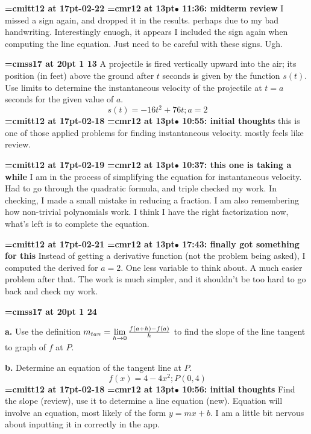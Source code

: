 {\medskip\noindent\bf\font\titlefont=cmitt12 at 17pt-02-22}\medskip
{\smallskip\noindent\bf\font\titlefont=cmr12 at 13pt\titlefont $\bullet$ 11:36: midterm review}\smallskip
I missed a sign again, and dropped it in the results. perhaps due to my bad handwriting. Interestingly enuogh, it appears I included the sign again when computing the line equation. Just need to be careful with these signs. Ugh.
\par

{\medskip\noindent\bf\font\titlefont=cmss17 at 20pt 1 13}\medskip
A projectile is fired vertically upward into the air; its
position (in feet) above the ground after $t$ seconds is
given by the function $s(t)$. Use limits to determine the
instantaneous velocity of the projectile at $t = a$ seconds
for the given value of $a$.
$$\
s(t) = -16t^2 + 76t; a = 2
$$
{\medskip\noindent\bf\font\titlefont=cmitt12 at 17pt-02-18}\medskip
{\smallskip\noindent\bf\font\titlefont=cmr12 at 13pt\titlefont $\bullet$ 10:55: initial thoughts}\smallskip
this is one of those applied problems for finding instantaneous velocity. mostly feels like review.
\par

{\medskip\noindent\bf\font\titlefont=cmitt12 at 17pt-02-19}\medskip
{\smallskip\noindent\bf\font\titlefont=cmr12 at 13pt\titlefont $\bullet$ 10:37: this one is taking a while}\smallskip
I am in the process of simplifying the equation for instantaneous velocity. Had to go through the quadratic formula, and triple checked my work. In checking, I made a small mistake in reducing a fraction. I am also remembering how non-trivial polynomials work. I think I have the right factorization now, what's left is to complete the equation.
\par

{\medskip\noindent\bf\font\titlefont=cmitt12 at 17pt-02-21}\medskip
{\smallskip\noindent\bf\font\titlefont=cmr12 at 13pt\titlefont $\bullet$ 17:43: finally got something for this}\smallskip
Instead of getting a derivative function (not the problem being asked), I computed the derived for $a = 2$. One less variable to think about. A much easier problem after that. The work is much simpler, and it shouldn't be too hard to go back and check my work.
\par

{\medskip\noindent\bf\font\titlefont=cmss17 at 20pt 1 24}\medskip
\par {\bf a.} Use the definition $m_{tan} =
\lim\limits_{h \to 0}{f(a + h) - f(a) \over h}$ to find
the slope of the line tangent to graph of $f$ at $P$.
\par {\bf b.} Determine an equation of the tangent line at $P$.
$$\
f(x) = 4 - 4x^2; P(0, 4)
$$
{\medskip\noindent\bf\font\titlefont=cmitt12 at 17pt-02-18}\medskip
{\smallskip\noindent\bf\font\titlefont=cmr12 at 13pt\titlefont $\bullet$ 10:56: initial thoughts}\smallskip
Find the slope (review), use it to determine a line equation (new). Equation will involve an equation, most likely of the form $y = mx + b$. I am a little bit nervous about inputting it in correctly in the app.
\par

